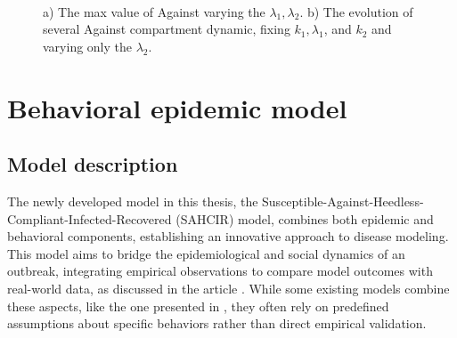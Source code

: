 \begin{figure}[h]
	\centering
	 \quad
	 \\
		\caption[Max against first case]{a) The max value of Against varying the $\lambda_1, \lambda_2$. b) The evolution of several Against compartment dynamic, fixing $k_1, \lambda_1$, and $k_2$ and varying only the $\lambda_2$.}
	\label{fig:max_against2}
\end{figure}

\chapter{Behavioral epidemic model}
\label{ch:epi_behav_model}
\section{Model description}

The newly developed model in this thesis, the Susceptible-Against-Heedless-Compliant-Infected-Recovered (SAHCIR) model, combines both epidemic and behavioral components, establishing an innovative approach to disease modeling. This model aims to bridge the epidemiological and social dynamics of an outbreak, integrating empirical observations to compare model outcomes with real-world data, as discussed in the article \cite{Proverbio_Tex_2024}. While some existing models combine these aspects, like the one presented in \cite{Bulai2023}, they often rely on predefined assumptions about specific behaviors rather than direct empirical validation.

